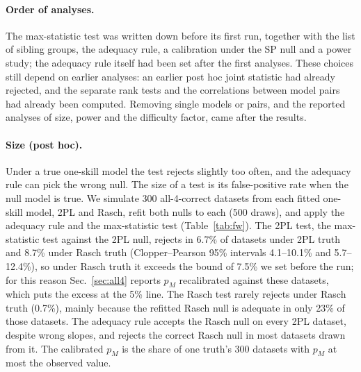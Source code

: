 \documentclass{article}
\theoremstyle{plain}
\theoremstyle{remark}
\begin{document}
\paragraph{Order of analyses.} The max-statistic test was written down
before its first run, together with the list of sibling groups, the
adequacy rule, a calibration under the SP null and a power study; the
adequacy rule itself had been set after the first analyses. These
choices still depend on earlier analyses: an earlier post hoc joint
statistic had already rejected,
and the separate rank tests and the correlations between model pairs
had already been computed. Removing single models or pairs, and the
reported analyses of size, power and the difficulty factor, came after
the results.

\paragraph{Size (post hoc).} Under a true one-skill model the test rejects slightly
too often, and the adequacy rule can pick the wrong
null. The size of a test is its false-positive rate
when the null model is true. We simulate 300 all-4-correct datasets from
each fitted one-skill model, 2PL and Rasch, refit both nulls to each
(500 draws), and apply the adequacy rule and the max-statistic test
(Table~\ref{tab:fw}). The 2PL test, the max-statistic test against the
2PL null, rejects in 6.7\% of datasets under 2PL truth and 8.7\% under
Rasch truth (Clopper--Pearson 95\% intervals 4.1--10.1\% and
5.7--12.4\%), so under Rasch truth it exceeds the bound of 7.5\% we set
before the run; for this reason Sec.~\ref{sec:all4} reports $p_M$
recalibrated against these datasets, which puts the excess at the 5\%
line. The Rasch test rarely rejects under Rasch truth (0.7\%),
mainly because the refitted Rasch null is adequate in only 23\% of those
datasets. The adequacy rule accepts the Rasch null on every 2PL dataset,
despite wrong slopes, and rejects the correct Rasch null
in most datasets drawn from it. The calibrated $p_M$ is the share of
one truth's 300 datasets with $p_M$ at most the observed value.
\end{document}
